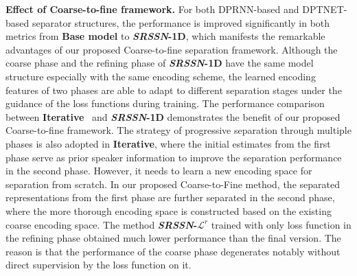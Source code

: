 \smallskip\noindent\textbf{Effect of Coarse-to-fine framework.}
For both DPRNN-based and DPTNET-based separator structures, the performance is improved significantly in both metrics from \textbf{Base model} to \textbf{\emph{SRSSN}-1D}, which manifests the remarkable advantages of our proposed Coarse-to-fine separation framework. Although the coarse phase and the refining phase of \textbf{\emph{SRSSN}-1D} have the same model structure especially with the same encoding scheme, the learned encoding features of two phases are able to adapt to different separation stages under the guidance of the loss functions during training. The performance comparison between \textbf{Iterative}~\cite{universal, improving} and \textbf{\emph{SRSSN}-1D} demonstrates the benefit of our proposed Coarse-to-fine framework. The strategy of progressive separation through multiple phases is also adopted in \textbf{Iterative}, where the initial estimates from the first phase serve as prior speaker information to improve the separation performance in the second phase. However, it needs to learn a new encoding space for separation from scratch. In our proposed Coarse-to-Fine method, the separated representations from the first phase are further separated in the second phase, where the more thorough encoding space is constructed based on the existing coarse encoding space.
The method \textbf{\emph{SRSSN}-$\mathcal{L}^r$} trained with only loss function in the refining phase obtained much lower performance than the final version. The reason is that the performance of the coarse phase degenerates notably without direct supervision by the loss function on it.





